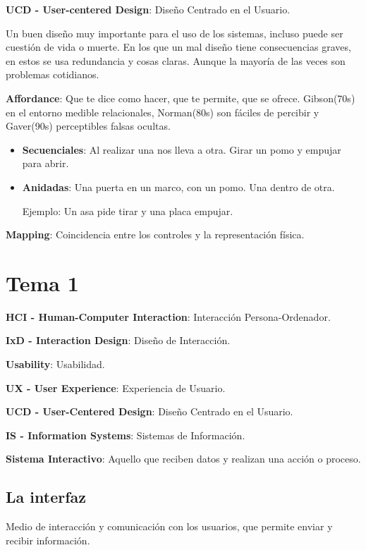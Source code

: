 \textbf{UCD - User-centered Design}: Diseño Centrado en el Usuario.

Un buen diseño muy importante para el uso de los sistemas, incluso puede
ser cuestión de vida o muerte. En los que un mal diseño tiene
consecuencias graves, en estos se usa redundancia y cosas claras. Aunque
la mayoría de las veces son problemas cotidianos.

\textbf{Affordance}: Que te dice como hacer, que te permite, que se
ofrece. Gibson(70s) en el entorno medible relacionales, Norman(80s) son
fáciles de percibir y Gaver(90s) perceptibles falsas ocultas.

\begin{itemize}
\item
  \textbf{Secuenciales}: Al realizar una nos lleva a otra. Girar un pomo
  y empujar para abrir.
\item
  \textbf{Anidadas}: Una puerta en un marco, con un pomo. Una dentro de
  otra.

  Ejemplo: Un asa pide tirar y una placa empujar.
\end{itemize}

\textbf{Mapping}: Coincidencia entre los controles y la representación
física.

\hypertarget{tema-1}{%
\section{Tema 1}\label{tema-1}}

\textbf{HCI - Human-Computer Interaction}: Interacción
Persona-Ordenador.

\textbf{IxD - Interaction Design}: Diseño de Interacción.

\textbf{Usability}: Usabilidad.

\textbf{UX - User Experience}: Experiencia de Usuario.

\textbf{UCD - User-Centered Design}: Diseño Centrado en el Usuario.

\textbf{IS - Information Systems}: Sistemas de Información.

\textbf{Sistema Interactivo}: Aquello que reciben datos y realizan una
acción o proceso.

\hypertarget{la-interfaz}{%
\subsection{La interfaz}\label{la-interfaz}}

Medio de interacción y comunicación con los usuarios, que permite enviar
y recibir información.

